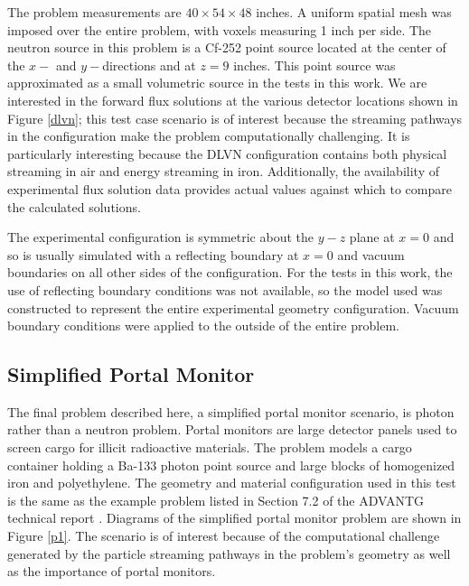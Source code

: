\documentclass{article} %
\begin{document}
The problem measurements are $40\times54\times48$ inches. A uniform spatial
mesh was imposed over the entire problem, with voxels measuring 1 inch per
side. The neutron source in this problem is a Cf-252 point source located at
the center of the $x-$ and $y-$directions and at $z = 9$ inches. This point
source was approximated as a small volumetric source in the tests in this
work. We are interested in the forward flux solutions at the various detector
locations shown in Figure \ref{dlvn}; this test case scenario is of interest
because the streaming pathways in the configuration make the problem
computationally challenging. It is particularly interesting because the DLVN
configuration contains both physical streaming in air and energy streaming in
iron. Additionally, the availability of experimental flux solution data
provides actual values against which to compare the calculated solutions.

The experimental configuration is symmetric about the $y-z$ plane at $x = 0$
and so is usually simulated with a reflecting boundary at $x = 0$ and vacuum
boundaries on all other sides of the configuration. For the tests in this work,
the use of reflecting boundary conditions was not available, so the model used 
was constructed to represent the entire experimental geometry configuration.
Vacuum boundary conditions were applied to the outside of the entire problem.

\subsection{Simplified Portal Monitor}

The final problem described here, a simplified portal monitor scenario, is
photon rather than a neutron problem. Portal monitors are large detector
panels used to screen cargo for illicit radioactive materials. The problem
models a cargo container holding a Ba-133 photon point source and large blocks
of homogenized iron and polyethylene. The geometry and material configuration
used in this test is the same as the example problem listed in Section 7.2 of
the ADVANTG technical report \cite{advantg}. Diagrams of the simplified portal
monitor problem are shown in Figure \ref{p1}. The scenario is of interest
because of the computational challenge generated by the particle streaming
pathways in the problem's geometry as well as the importance of portal
monitors.
\end{document}
